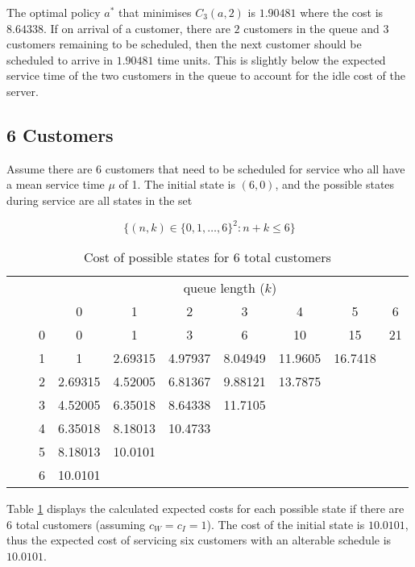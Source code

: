 The optimal policy $a^{*}$ that minimises $C_{3} (a, 2)$ is $1.90481$ where the cost is $8.64338$. If on arrival of a customer, there are $2$ customers in the queue and $3$ customers remaining to be scheduled, then the next customer should be scheduled to arrive in $1.90481$ time units. This is slightly below the expected service time of the two customers in the queue to account for the idle cost of the server.

\subsection{6 Customers}

Assume there are 6 customers that need to be scheduled for service who all have a mean service time $\mu$ of 1. The initial state is $(6, 0)$, and the possible states during service are all states in the set

\begin{equation}
	\Big\{ (n, k) \in \{ 0, 1, \ldots, 6 \}^{2} : n + k \leq 6 \Big\}
\end{equation}

\begin{table}[htb]
	\centering
	\begin{tabular}{c c c || c | c | c | c | c | c | c}
		& & & \multicolumn{7}{c}{queue length ($k$)} \\
		& & & 0 & 1 & 2 & 3 & 4 & 5 & 6 \\ \hline \hline
		\parbox[t]{2mm}{} & \parbox[t]{2mm}{} & 0 & 0 & 1 & 3 & 6 & 10 & 15 & 21 \\
		& & 1 & 1 & 2.69315 & 4.97937 & 8.04949 & 11.9605 & 16.7418 \\
		& & 2 & 2.69315 & 4.52005 & 6.81367 & 9.88121 & 13.7875 & \\
		& & 3 & 4.52005 & 6.35018 & 8.64338 & 11.7105 & & \\
		& & 4 & 6.35018 & 8.18013 & 10.4733 & & & \\
		& & 5 & 8.18013 & 10.0101 & & & & \\
		& & 6 & 10.0101 & & & & & \\
	\end{tabular}
	\caption{Cost of possible states for 6 total customers}
	\label{Cost_6_Customers}
\end{table}

Table \ref{Cost_6_Customers} displays the calculated expected costs for each possible state if there are 6 total customers (assuming $c_{W} = c_{I} = 1$). The cost of the initial state is $10.0101$, thus the expected cost of servicing six customers with an alterable schedule is $10.0101$.

